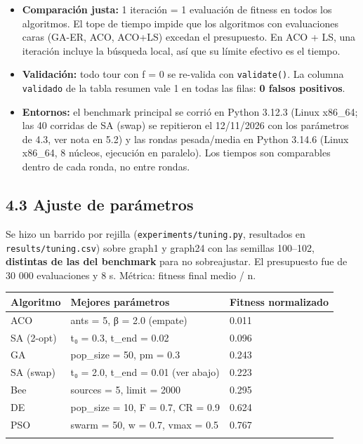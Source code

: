 \documentclass[
  spanish,
  11pt,
]{article}
\newcounter{none} %
\providecommand{\tightlist}{%
  \setlength{\itemsep}{0pt}\setlength{\parskip}{0pt}}
\begin{document}
\begin{itemize}
\tightlist
\item
  \textbf{Comparación justa:} 1 iteración = 1 evaluación de fitness en
  todos los algoritmos. El tope de tiempo impide que los algoritmos con
  evaluaciones caras (GA-ER, ACO, ACO+LS) excedan el presupuesto. En ACO
  + LS, una iteración incluye la búsqueda local, así que su límite
  efectivo es el tiempo.
\item
  \textbf{Validación:} todo tour con f = 0 se re-valida con
  \texttt{validate()}. La columna \texttt{validado} de la tabla resumen
  vale 1 en todas las filas: \textbf{0 falsos positivos}.
\item
  \textbf{Entornos:} el benchmark principal se corrió en Python 3.12.3
  (Linux x86\_64; las 40 corridas de SA (swap) se repitieron el
  12/11/2026 con los parámetros de 4.3, ver nota en 5.2) y las rondas
  pesada/media en Python 3.14.6 (Linux x86\_64, 8 núcleos, ejecución en
  paralelo). Los tiempos son comparables dentro de cada ronda, no entre
  rondas.
\end{itemize}

\subsection{4.3 Ajuste de parámetros}\label{ajuste-de-paruxe1metros}

Se hizo un barrido por rejilla (\texttt{experiments/tuning.py},
resultados en \texttt{results/tuning.csv}) sobre graph1 y graph24 con
las semillas 100--102, \textbf{distintas de las del benchmark} para no
sobreajustar. El presupuesto fue de 30 000 evaluaciones y 8 s. Métrica:
fitness final medio / n.

{\def\LTcaptype{none} %
\begin{center}
\begin{tabular}{@{}lll@{}}
\toprule\noalign{}
Algoritmo & Mejores parámetros & Fitness normalizado \\
\midrule\noalign{}
ACO & ants = 5, β = 2.0 (empate) & 0.011 \\
SA (2-opt) & t₀ = 0.3, t\_end = 0.02 & 0.096 \\
GA & pop\_size = 50, pm = 0.3 & 0.243 \\
SA (swap) & t₀ = 2.0, t\_end = 0.01 (ver abajo) & 0.223 \\
Bee & sources = 5, limit = 2000 & 0.295 \\
DE & pop\_size = 10, F = 0.7, CR = 0.9 & 0.624 \\
PSO & swarm = 50, w = 0.7, vmax = 0.5 & 0.767 \\
\bottomrule\noalign{}
\end{tabular}
\end{center}
}
\end{document}
